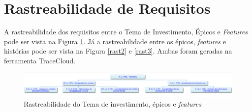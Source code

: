\section[Rastreabilidade de Requisitos]{Rastreabilidade de Requisitos}
% 
% 
% 
% 
% 
% 
% 

A rastreabilidade dos requisitos entre o Tema de Investimento, Épicos e \textit{Features} pode ser vista na Figura \ref{fig:rastreabilidade}.
Já a rastreabilidade entre os épicos, \textit{features} e histórias pode ser vista na Figura \ref{rast2} e \ref{rast3}. Ambas foram geradas
na ferramenta TraceCloud.

\begin{figure}[!htb]
 \centering
 \includegraphics[scale= 0.5, angle=-90]{figuras/rastreabilidade_ferramenta.png}
 \caption{Rastreabilidade do Tema de investimento, épicos e \textit{features}}
 \label{fig:rastreabilidade}
\end{figure}

